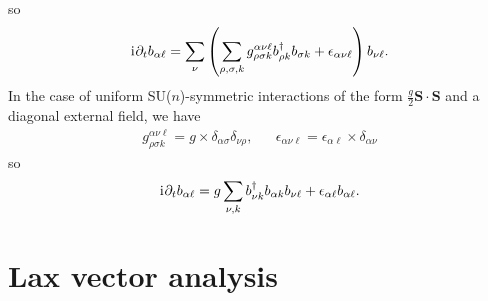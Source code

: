 \documentclass[nofootinbib,twocolumn]{revtex4-2}
\newcommand{\p}[1]{\left(#1\right)} %
\renewcommand{\v}{\bm} %
\renewcommand{\c}{\cdot} %
\renewcommand{\i}{\mathrm{i}\mkern1mu} %
\newcommand{\1}{\mathds{1}}
\begin{document}
so
\begin{align}
  \i \partial_t b_{\alpha\ell}
  = \sum_\nu \p{\sum_{\rho,\sigma,k}
    g^{\alpha\nu\ell}_{\rho\sigma k} b_{\rho k}^\dag b_{\sigma k}
    + \epsilon_{\alpha\nu\ell}} b_{\nu\ell}.
\end{align}
In the case of uniform SU($n$)-symmetric interactions of the form $\frac{g}{2}\v S\c\v S$ and a diagonal external field, we have
\begin{align}
  g^{\alpha\nu\ell}_{\rho\sigma k}
  = g \times \delta_{\alpha\sigma} \delta_{\nu\rho},
  &&
  \epsilon_{\alpha\nu\ell}
  = \epsilon_{\alpha\ell} \times \delta_{\alpha\nu}
\end{align}
so
\begin{align}
  \i \partial_t b_{\alpha\ell}
  = g \sum_{\nu,k} b_{\nu k}^\dag b_{\alpha k} b_{\nu\ell}
  + \epsilon_{\alpha\ell} b_{\alpha\ell}.
\end{align}

\section{Lax vector analysis}
\end{document}
